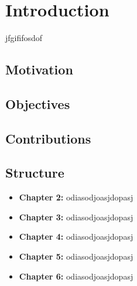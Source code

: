 

\chapter{Introduction}
\label{chapter:introduction}

jfgififosdof

\section{Motivation}


\section{Objectives}


\section{Contributions}


\section{Structure}

\begin{itemize}

	\item{\textbf{Chapter 2:} odiasodjoasjdopasj}
	\item{\textbf{Chapter 3:} odiasodjoasjdopasj}
	\item{\textbf{Chapter 4:} odiasodjoasjdopasj}
	\item{\textbf{Chapter 5:} odiasodjoasjdopasj}
	\item{\textbf{Chapter 6:} odiasodjoasjdopasj}

\end{itemize}